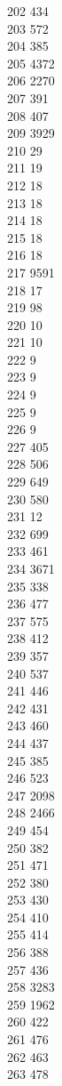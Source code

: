 { 202	434 \\
 203	572 \\
 204	385 \\
 205	4372 \\
 206	2270 \\
 207	391 \\
 208	407 \\
 209	3929 \\
 210	29 \\
 211	19 \\
 212	18 \\
 213	18 \\
 214	18 \\
 215	18 \\
 216	18 \\
 217	9591 \\
 218	17 \\
 219	98 \\
 220	10 \\
 221	10 \\
 222	9 \\
 223	9 \\
 224	9 \\
 225	9 \\
 226	9 \\
 227	405 \\
 228	506 \\
 229	649 \\
 230	580 \\
 231	12 \\
 232	699 \\
 233	461 \\
 234	3671 \\
 235	338 \\
 236	477 \\
 237	575 \\
 238	412 \\
 239	357 \\
 240	537 \\
 241	446 \\
 242	431 \\
 243	460 \\
 244	437 \\
 245	385 \\
 246	523 \\
 247	2098 \\
 248	2466 \\
 249	454 \\
 250	382 \\
 251	471 \\
 252	380 \\
 253	430 \\
 254	410 \\
 255	414 \\
 256	388 \\
 257	436 \\
 258	3283 \\
 259	1962 \\
 260	422 \\
 261	476 \\
 262	463 \\
 263	478 \\
}

